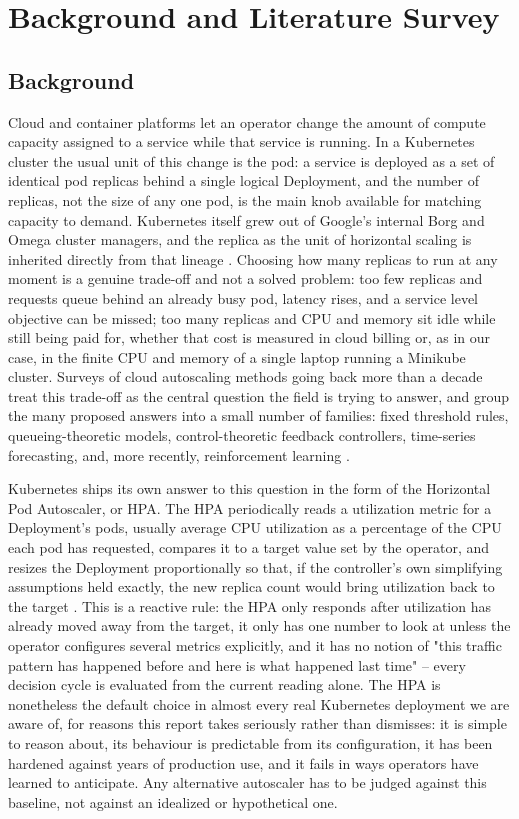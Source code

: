\section{Background and Literature Survey}
\label{sec:intro-background}

\subsection{Background}

Cloud and container platforms let an operator change the amount of compute
capacity assigned to a service while that service is running. In a
Kubernetes cluster the usual unit of this change is the pod: a service is
deployed as a set of identical pod replicas behind a single logical
Deployment, and the number of replicas, not the size of any one pod, is the
main knob available for matching capacity to demand. Kubernetes itself grew
out of Google's internal Borg and Omega cluster managers, and the replica as
the unit of horizontal scaling is inherited directly from that lineage
\cite{burns2016borg}. Choosing how many replicas to run at any moment is a
genuine trade-off and not a solved problem: too few replicas and requests
queue behind an already busy pod, latency rises, and a service level
objective can be missed; too many replicas and CPU and memory sit idle while
still being paid for, whether that cost is measured in cloud billing or, as
in our case, in the finite CPU and memory of a single laptop running a
Minikube cluster. Surveys of cloud autoscaling methods going back more than a
decade treat this trade-off as the central question the field is trying to
answer, and group the many proposed answers into a small number of families:
fixed threshold rules, queueing-theoretic models, control-theoretic
feedback controllers, time-series forecasting, and, more recently,
reinforcement learning \cite{lorido2014review}\cite{qu2018survey}.

Kubernetes ships its own answer to this question in the form of the
Horizontal Pod Autoscaler, or HPA. The HPA periodically reads a utilization
metric for a Deployment's pods, usually average CPU utilization as a
percentage of the CPU each pod has requested, compares it to a target value
set by the operator, and resizes the Deployment proportionally so that, if
the controller's own simplifying assumptions held exactly, the new replica
count would bring utilization back to the target
\cite{k8s_hpa_docs}. This is a reactive rule: the HPA only responds after
utilization has already moved away from the target, it only has one number
to look at unless the operator configures several metrics explicitly, and it
has no notion of "this traffic pattern has happened before and here is what
happened last time" -- every decision cycle is evaluated from the current
reading alone. The HPA is nonetheless the default choice in almost every
real Kubernetes deployment we are aware of, for reasons this report takes
seriously rather than dismisses: it is simple to reason about, its behaviour
is predictable from its configuration, it has been hardened against years of
production use, and it fails in ways operators have learned to anticipate.
Any alternative autoscaler has to be judged against this baseline, not
against an idealized or hypothetical one.

